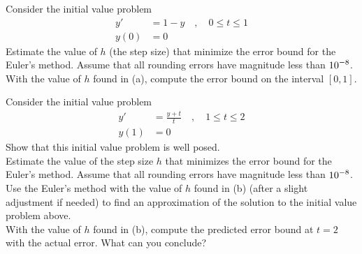 \begin{question}
Consider the initial value problem
\begin{align*}
y' &= 1 - y \quad , \quad 0 \leq t \leq 1 \\
y(0) &= 0
\end{align*}
 Estimate the value of $h$ (the step size) that minimize the
error bound for the Euler's method.  Assume that all rounding errors
have magnitude less than $\displaystyle 10^{-8}$. \\
 With the value of $h$ found in (a), compute the error bound
on the interval $[0,1]$.
\end{question}

\begin{question}
Consider the initial value problem
\begin{align*}
y' &= \frac{y + t}{t} \quad , \quad 1 \leq t \leq 2 \\
y(1) &= 0
\end{align*}
 Show that this initial value problem is well posed.\\
 Estimate the value of the step size $h$ that minimizes the error
bound for the Euler's method.  Assume that all rounding errors have
magnitude less than $\displaystyle 10^{-8}$.\\
 Use the Euler's method with the value of $h$ found in (b)
(after a slight adjustment if needed) to find an approximation of the
solution to the initial value problem above.\\
 With the value of $h$ found in (b), compute the predicted
error bound at $t=2$ with the actual error.  What can you conclude?
\end{question}


